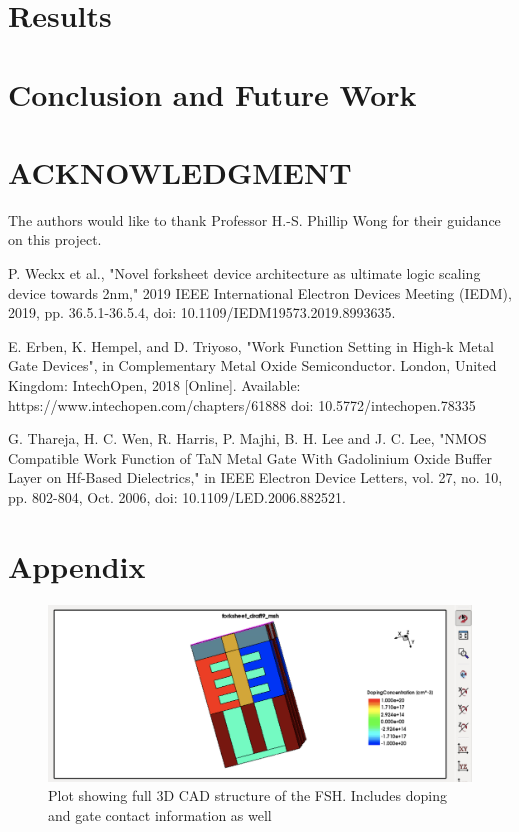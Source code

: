 \documentclass[letterpaper, 12 pt, conference]{ieeeconf}  %
\begin{document}
\section{Results}




\section{Conclusion and Future Work}



\section*{ACKNOWLEDGMENT}

The authors would like to thank Professor H.-S. Phillip Wong for their guidance on this project.



\begin{thebibliography}{99}


 P. Weckx et al., "Novel forksheet device architecture as ultimate logic scaling device towards 2nm," 2019 IEEE International Electron Devices Meeting (IEDM), 2019, pp. 36.5.1-36.5.4, doi: 10.1109/IEDM19573.2019.8993635.


 E. Erben, K. Hempel, and D. Triyoso, "Work Function Setting in High-k Metal Gate Devices", in Complementary Metal Oxide Semiconductor. London, United Kingdom: IntechOpen, 2018 [Online]. Available: https://www.intechopen.com/chapters/61888 doi: 10.5772/intechopen.78335

 G. Thareja, H. C. Wen, R. Harris, P. Majhi, B. H. Lee and J. C. Lee, "NMOS Compatible Work Function of TaN Metal Gate With Gadolinium Oxide Buffer Layer on Hf-Based Dielectrics," in IEEE Electron Device Letters, vol. 27, no. 10, pp. 802-804, Oct. 2006, doi: 10.1109/LED.2006.882521.


\end{thebibliography}

\newpage
\section{Appendix}

\begin{figure}[H]
    \centering
    \includegraphics[width=.9\linewidth]{Screen Shot 2022-02-26 at 3.13.29 PM.png}
    \caption{Plot showing full 3D CAD structure of the FSH. Includes doping and gate contact information as well}
    \label{fig:knngraph1}
\end{figure}
\end{document}
